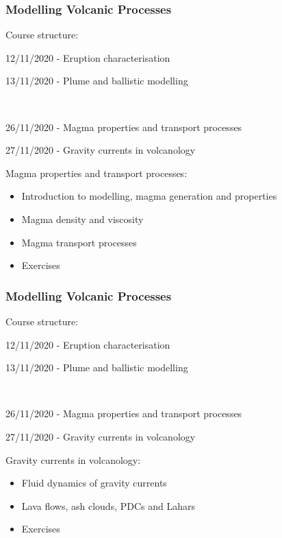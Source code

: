 \documentclass{beamer}
\begin{document}
\begin{frame}
  \frametitle{Modelling Volcanic Processes}

  Course structure:
  \begin{itemize}
  \item {\color{gray} 12/11/2020 - Eruption characterisation \\
  \item 13/11/2020 - Plume and ballistic modelling} \\
  \item 26/11/2020 - Magma properties and transport processes \\
  \item 27/11/2020 - Gravity currents in volcanology \\
  \end{itemize}

  \vspace{1cm}
  
  Magma properties and transport processes:
  \begin{itemize}
  \item Introduction to modelling, magma generation and properties \\
  \item Magma density and viscosity \\
  \item Magma transport processes \\
  \item Exercises
  \end{itemize}
\end{frame}
\begin{frame}
  \frametitle{Modelling Volcanic Processes}

  Course structure:
  \begin{itemize}
  \item {\color{gray} 12/11/2020 - Eruption characterisation \\
  \item 13/11/2020 - Plume and ballistic modelling} \\
  \item 26/11/2020 - Magma properties and transport processes \\
  \item 27/11/2020 - Gravity currents in volcanology \\
  \end{itemize}

  \vspace{1cm}
  
  Gravity currents in volcanology:
  \begin{itemize}
  \item Fluid dynamics of gravity currents \\
  \item Lava flows, ash clouds, PDCs and Lahars \\
  \item Exercises
  \end{itemize}
\end{frame}
\end{document}
